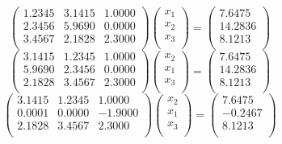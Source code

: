 \documentclass[11pt,a4paper,oneside]{article}
\begin{document}
$$ \left(\begin{matrix}         1.2345 & 3.1415 & 1.0000 \\     2.3456 & 5.9690 & 0.0000 \\     3.4567 & 2.1828 & 2.3000 \\ \end{matrix}\right) \left(\begin{matrix}    x_1 \\  x_2 \\  x_3 \\ \end{matrix}\right) = \left(\begin{matrix}    7.6475 \\       14.2836 \\      8.1213 \\ \end{matrix}\right) $$
$$ \left(\begin{matrix}         3.1415 & 1.2345 & 1.0000 \\     5.9690 & 2.3456 & 0.0000 \\     2.1828 & 3.4567 & 2.3000 \\ \end{matrix}\right) \left(\begin{matrix}    x_2 \\  x_1 \\  x_3 \\ \end{matrix}\right) = \left(\begin{matrix}    7.6475 \\       14.2836 \\      8.1213 \\ \end{matrix}\right) $$
$$ \left(\begin{matrix}         3.1415 & 1.2345 & 1.0000 \\     0.0001 & 0.0000 & -1.9000 \\    2.1828 & 3.4567 & 2.3000 \\ \end{matrix}\right) \left(\begin{matrix}    x_2 \\  x_1 \\  x_3 \\ \end{matrix}\right) = \left(\begin{matrix}    7.6475 \\       -0.2467 \\      8.1213 \\ \end{matrix}\right) $$
\end{document}
